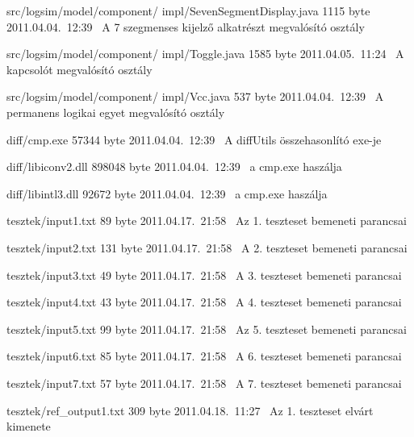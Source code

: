 \begin{fajllista}
\fajl
{src/logsim/model/component/\newline
impl/SevenSegmentDisplay.java} %
{1115 byte} %
{2011.04.04.~12:39~} %
{A 7 szegmenses kijelző alkatrészt megvalósító osztály} %

\fajl
{src/logsim/model/component/\newline
impl/Toggle.java} %
{1585 byte} %
{2011.04.05.~11:24~} %
{A kapcsolót megvalósító osztály} %

\fajl
{src/logsim/model/component/\newline
impl/Vcc.java} %
{537 byte} %
{2011.04.04.~12:39~} %
{A permanens logikai egyet megvalósító osztály} %

\fajl
{diff/cmp.exe} %
{57344 byte} %
{2011.04.04.~12:39~} %
{A diffUtils összehasonlító exe-je} %

\fajl
{diff/libiconv2.dll} %
{898048 byte} %
{2011.04.04.~12:39~} %
{a cmp.exe haszálja} %

\fajl
{diff/libintl3.dll} %
{92672 byte} %
{2011.04.04.~12:39~} %
{a cmp.exe haszálja} %

\fajl
{tesztek/input1.txt} %
{89 byte} %
{2011.04.17.~21:58~} %
{Az 1. teszteset bemeneti parancsai} %

\fajl
{tesztek/input2.txt} %
{131 byte} %
{2011.04.17.~21:58~} %
{A 2. teszteset bemeneti parancsai} %

\fajl
{tesztek/input3.txt} %
{49 byte} %
{2011.04.17.~21:58~} %
{A 3. teszteset bemeneti parancsai} %

\fajl
{tesztek/input4.txt} %
{43 byte} %
{2011.04.17.~21:58~} %
{A 4. teszteset bemeneti parancsai} %

\fajl
{tesztek/input5.txt} %
{99 byte} %
{2011.04.17.~21:58~} %
{Az 5. teszteset bemeneti parancsai} %

\fajl
{tesztek/input6.txt} %
{85 byte} %
{2011.04.17.~21:58~} %
{A 6. teszteset bemeneti parancsai} %

\fajl
{tesztek/input7.txt} %
{57 byte} %
{2011.04.17.~21:58~} %
{A 7. teszteset bemeneti parancsai} %

\fajl
{tesztek/ref\_output1.txt} %
{309 byte} %
{2011.04.18.~11:27~} %
{Az 1. teszteset elvárt kimenete} %


\end{fajllista}
